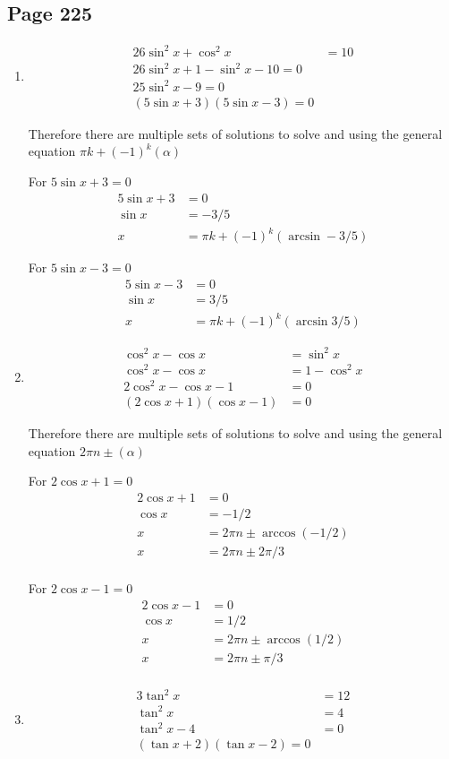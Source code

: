 \documentclass{article}
\newenvironment{solutions}[1]
{\subsection*{#1}
 \begin{enumerate}[leftmargin=1.5em]}
{\end{enumerate}}
\newcommand{\solution}{\item}
\begin{document}
\begin{solutions}{Page 225}
Note: I think the question is supposed to be $\cos x = \sin 4x$?

\solution
\begin{align*}
    26\sin^2 x + \cos^2 x &= 10\\
    26\sin^2 x + 1- \sin^2 x -10 =0\\
    25\sin^2 x -9 = 0\\
    (5\sin x +3)(5\sin x-3)=0
\end{align*}

Therefore there are multiple sets of solutions to solve and using the general equation $\pi k + (-1)^k (\alpha)$

For $5\sin x+3 = 0$
\begin{align*}
    5\sin x +3 &= 0\\
    \sin x &= -3/5\\
    x &= \pi k + (-1)^k (\arcsin -3/5)
\end{align*}

For $5\sin x-3 = 0$
\begin{align*}
    5\sin x -3 &= 0\\
    \sin x &= 3/5\\
    x &= \pi k + (-1)^k (\arcsin 3/5)
\end{align*}
\solution
\begin{align*}
    \cos^2 x - \cos x &= \sin^2 x \\
    \cos^2 x - \cos x &= 1-\cos^2 x\\
    2\cos^2 x -\cos x -1 &=0\\
    (2\cos x +1)(\cos x -1) &=0
\end{align*}

Therefore there are multiple sets of solutions to solve and using the general equation $2\pi n \pm (\alpha)$

For $2\cos x +1=0$
\begin{align*}
    2\cos x +1&=0\\
    \cos x &= -1/2\\
    x &= 2\pi n \pm \arccos(-1/2)\\
    x &= 2\pi n \pm 2\pi/3\\
\end{align*}

For $2\cos x -1=0$
\begin{align*}
    2\cos x -1&=0\\
    \cos x &= 1/2\\
    x &= 2\pi n \pm \arccos(1/2)\\
    x &= 2\pi n \pm \pi/3\\
\end{align*}
\solution
\begin{align*}
    3\tan^2 x &= 12\\
    \tan^2 x &= 4\\
    \tan^2 x -4&= 0\\
    (\tan x +2)(\tan x -2)= 0
\end{align*}


\end{solutions}
\end{document}
